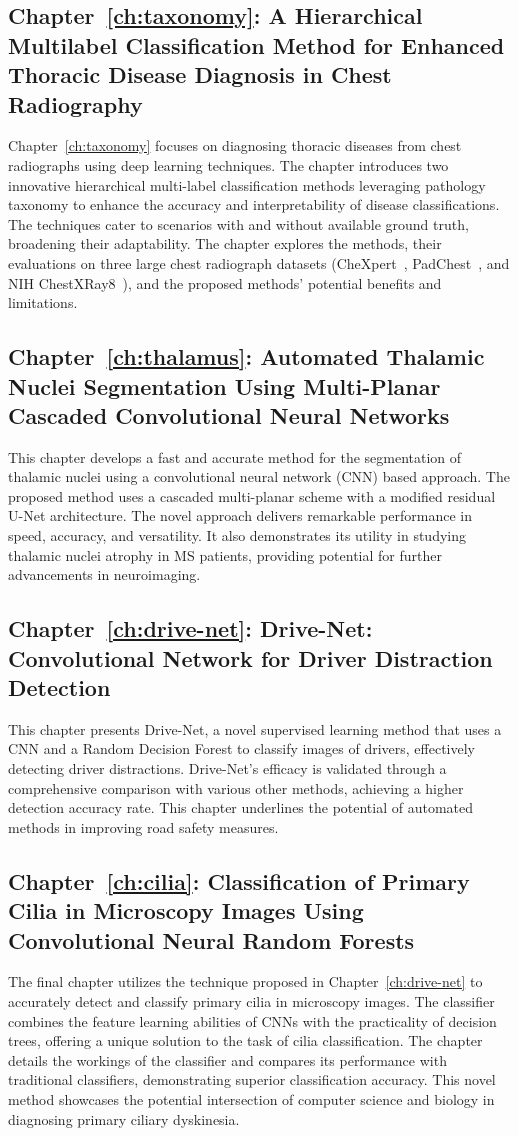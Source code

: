 \subsection*{Chapter~\ref{ch:taxonomy}: A Hierarchical Multilabel Classification Method for Enhanced Thoracic Disease Diagnosis in Chest Radiography}
Chapter~\ref{ch:taxonomy} focuses on diagnosing thoracic diseases from chest radiographs using deep learning techniques. The chapter introduces two innovative hierarchical multi-label classification methods leveraging pathology taxonomy to enhance the accuracy and interpretability of disease classifications. The techniques cater to scenarios with and without available ground truth, broadening their adaptability. The chapter explores the methods, their evaluations on three large chest radiograph datasets (CheXpert~\cite{irvin_CheXpert_2019}, PadChest~\cite{bustos_Padchest_2020}, and NIH ChestXRay8~\cite{wang_ChestXRay8_2017}), and the proposed methods' potential benefits and limitations.
\subsection*{Chapter~\ref{ch:thalamus}: Automated Thalamic Nuclei Segmentation Using Multi-Planar Cascaded Convolutional Neural Networks}
This chapter develops a fast and accurate method for the segmentation of thalamic nuclei using a convolutional neural network (CNN) based approach. The proposed method uses a cascaded multi-planar scheme with a modified residual U-Net architecture. The novel approach delivers remarkable performance in speed, accuracy, and versatility. It also demonstrates its utility in studying thalamic nuclei atrophy in MS patients, providing potential for further advancements in neuroimaging.
\subsection*{Chapter~\ref{ch:drive-net}: Drive-Net: Convolutional Network for Driver Distraction Detection} This chapter presents Drive-Net, a novel supervised learning method that uses a CNN and a Random Decision Forest to classify images of drivers, effectively detecting driver distractions. Drive-Net's efficacy is validated through a comprehensive comparison with various other methods, achieving a higher detection accuracy rate. This chapter underlines the potential of automated methods in improving road safety measures.
\subsection*{Chapter~\ref{ch:cilia}: Classification of Primary Cilia in Microscopy Images Using Convolutional Neural Random Forests}
The final chapter utilizes the technique proposed in Chapter~\ref{ch:drive-net} to accurately detect and classify primary cilia in microscopy images. The classifier combines the feature learning abilities of CNNs with the practicality of decision trees, offering a unique solution to the task of cilia classification. The chapter details the workings of the classifier and compares its performance with traditional classifiers, demonstrating superior classification accuracy. This novel method showcases the potential intersection of computer science and biology in diagnosing primary ciliary dyskinesia.
